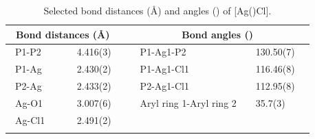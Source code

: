 \begin{table}[htbp]
\caption[Selected bond distances and angles of [Ag(\tButhixantphos)Cl{]}]{Selected bond distances (\AA) and angles (\degrees) of [Ag(\tButhixantphos)Cl].}
\vspace{1em}
\label{table:crystalthixantphossilverchloride:lengths}
\small
\begin{center}
\begin{tabular}{l l l l}
	\toprule
	\multicolumn{2}{l}{\bfseries{~Bond distances (\si{\angstrom})}} & \multicolumn{2}{c}{\bfseries{Bond angles (\degrees)}} \\
	\midrule		
	~P1-P2		~~&~~4.416(3)~~	&~~P1-Ag1-P2			&~~130.50(7)~~	\\	
	~P1-Ag		~~&~~2.430(2)~~	&~~P1-Ag1-Cl1			&~~116.46(8)~~	\\
	~P2-Ag		~~&~~2.433(2)~~	&~~P2-Ag1-Cl1			&~~112.95(8)~~	\\
	~Ag-O1		~~&~~3.007(6)~~	&~~Aryl ring 1-Aryl ring 2		&~~35.7(3)~~		\\
	~Ag-Cl1		~~&~~2.491(2)~~	&~~					&~~		~~		\\
	\bottomrule{}
\end{tabular}
\end{center}
\end{table}

